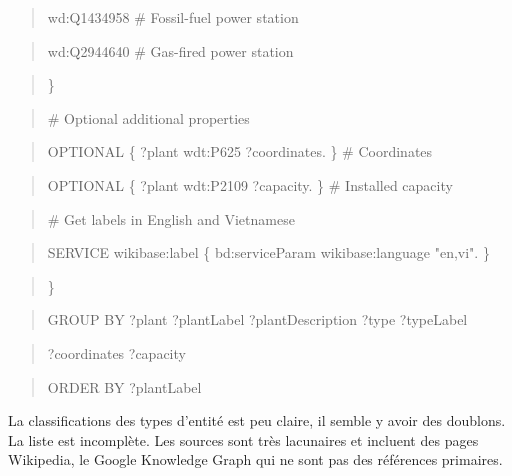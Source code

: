 \documentclass[a4paper,11pt]{report}
\begin{document}
\begin{quote}
wd:Q1434958 \# Fossil-fuel power station
\end{quote}

\begin{quote}
wd:Q2944640 \# Gas-fired power station
\end{quote}

\begin{quote}
\}
\end{quote}

\begin{quote}
\end{quote}

\begin{quote}
\# Optional additional properties
\end{quote}

\begin{quote}
OPTIONAL \{ ?plant wdt:P625 ?coordinates. \} \# Coordinates
\end{quote}

\begin{quote}
OPTIONAL \{ ?plant wdt:P2109 ?capacity. \} \# Installed capacity
\end{quote}

\begin{quote}
\end{quote}

\begin{quote}
\# Get labels in English and Vietnamese
\end{quote}

\begin{quote}
SERVICE wikibase:label \{ bd:serviceParam wikibase:language "en,vi". \}
\end{quote}

\begin{quote}
\}
\end{quote}

\begin{quote}
GROUP BY ?plant ?plantLabel ?plantDescription ?type ?typeLabel
\end{quote}

\begin{quote}
?coordinates ?capacity
\end{quote}

\begin{quote}
ORDER BY ?plantLabel
\end{quote}

La classifications des types d'entité est peu claire, il semble y avoir des doublons. La liste est incomplète. Les sources sont très lacunaires et incluent des pages Wikipedia, le Google Knowledge Graph qui ne sont pas des références primaires.
\end{document}
